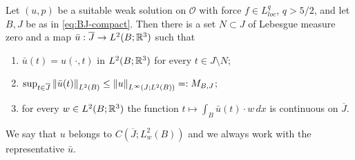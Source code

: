 \documentclass[11pt,reqno]{amsart}
\begin{document}
\begin{lemma}\label{lem:weak-time-continuity}
Let $(u,p)$ be a suitable weak solution on $\mathcal{O}$ with force
$f\in L^{q}_{loc}$, $q>5/2$, and let $B,J$ be as in \eqref{eq:BJ-compact}. Then
there is a set $N\subset J$ of Lebesgue measure zero and a map
$\bar u:\overline{J}\to L^{2}(B;\mathbb{R}^{3})$ such that
\begin{enumerate}
\item[(i)] $\bar u(t)=u(\cdot,t)$ in $L^{2}(B;\mathbb{R}^{3})$ for every $t\in J\setminus N$;
\item[(ii)] $\sup_{t\in\overline{J}}\left\lVert \bar u(t) \right\rVert_{L^{2}(B)}
  \le\left\lVert u \right\rVert_{L^{\infty}(J;L^{2}(B))}=:M_{B,J}$;
\item[(iii)] for every $w\in L^{2}(B;\mathbb{R}^{3})$ the function
  $t\mapsto\int_{B}\bar u(t)\cdot w\,dx$ is continuous on $\overline{J}$.
\end{enumerate}
We say that $u$ belongs to $C(\overline{J};L^{2}_{w}(B))$ and we always work
with the representative $\bar u$.
\end{lemma}
\end{document}
